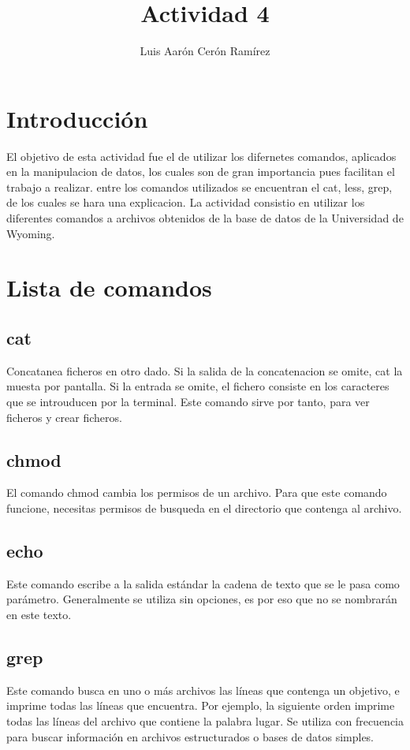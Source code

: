 \documentclass{article}
\title{Actividad 4}
\author{Luis Aarón Cerón Ramírez}
\begin{document}
\maketitle
\section{Introducción}
El objetivo de esta actividad fue el de utilizar los difernetes comandos, aplicados en la manipulacion de datos, los cuales son de gran importancia pues facilitan el trabajo a realizar.
entre los comandos utilizados se encuentran el cat, less, grep, de los cuales se hara una explicacion.
La actividad consistio en utilizar los diferentes comandos a archivos obtenidos de la base de datos de la Universidad de Wyoming.

\section{Lista de comandos}
\subsection{cat}
Concatanea ficheros en otro dado. Si la salida de la concatenacion se omite, cat la muesta por pantalla. Si la entrada se omite, el fichero consiste en los caracteres que se introuducen por la terminal.
\newline
Este comando sirve por tanto, para ver ficheros y crear ficheros.
\subsection{chmod}
El comando chmod cambia los permisos de un archivo. Para que este comando funcione, necesitas permisos de busqueda en el directorio que contenga al archivo.
\subsection{echo}
Este comando escribe a la salida estándar la cadena de texto que se le pasa como parámetro. Generalmente se utiliza sin opciones, es por eso que no se nombrarán en este texto.
\subsection{grep}
Este comando busca en uno o más archivos las líneas que contenga un objetivo, e imprime todas las líneas que encuentra. Por ejemplo, la siguiente orden imprime todas las líneas del archivo que contiene la palabra lugar.
Se utiliza con frecuencia para buscar información en archivos estructurados o bases de datos simples.
\end{document}
